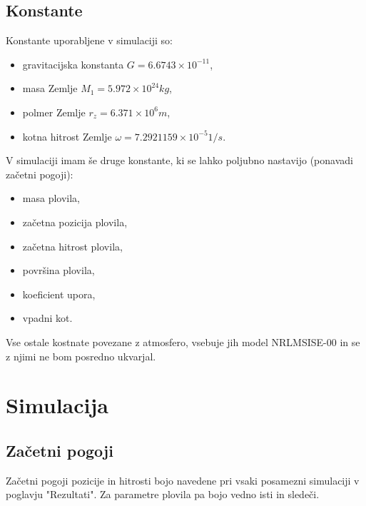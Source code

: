 \documentclass[a4paper,12pt]{article}
\begin{document}
    \subsection{Konstante}
    Konstante uporabljene v simulaciji so:
    \begin{itemize}
        \item gravitacijska konstanta $G = 6.6743\times10^{-11}$,
        \item masa Zemlje $M_1 = 5.972\times10^{24} kg$,
        \item polmer Zemlje $r_z = 6.371\times10^{6} m$,
        \item kotna hitrost Zemlje $\omega = 7.2921159\times10^{-5} 1/s$.
    \end{itemize}
    V simulaciji imam še druge konstante, ki se lahko poljubno nastavijo (ponavadi začetni pogoji):
    \begin{itemize}
        \item masa plovila,
        \item začetna pozicija plovila,
        \item začetna hitrost plovila,
        \item površina plovila,
        \item koeficient upora,
        \item vpadni kot.
    \end{itemize}
    Vse ostale kostnate povezane z atmosfero, vsebuje jih model NRLMSISE-00\cite{fig:vir5} in se z njimi ne bom posredno ukvarjal.

    \section{Simulacija}
    \subsection{Začetni pogoji}
    Začetni pogoji pozicije in hitrosti bojo navedene pri vsaki posamezni simulaciji v poglavju "Rezultati".
    Za parametre plovila pa bojo vedno isti in sledeči.
\end{document}
